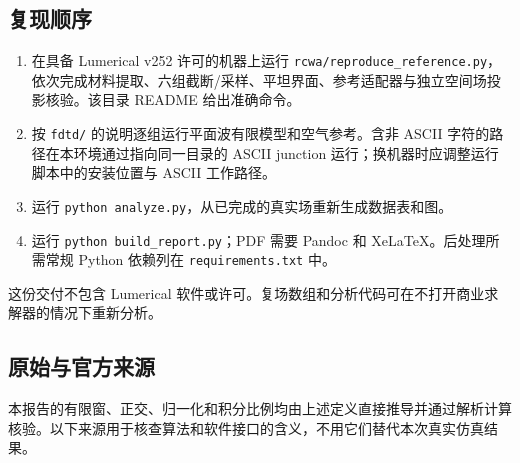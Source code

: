 \documentclass[
  chinese,
  UTF8,
  a4paper,
  11pt]{ctexart}
\providecommand{\tightlist}{%
  \setlength{\itemsep}{0pt}\setlength{\parskip}{0pt}}
\begin{document}
\subsection{复现顺序}\label{ux590dux73b0ux987aux5e8f}

\begin{enumerate}
\def\labelenumi{\arabic{enumi}.}
\tightlist
\item
  在具备 Lumerical v252 许可的机器上运行
  \texttt{rcwa/reproduce\_reference.py}，依次完成材料提取、六组截断/采样、平坦界面、参考适配器与独立空间场投影核验。该目录
  README 给出准确命令。
\item
  按 \texttt{fdtd/} 的说明逐组运行平面波有限模型和空气参考。含非 ASCII
  字符的路径在本环境通过指向同一目录的 ASCII junction
  运行；换机器时应调整运行脚本中的安装位置与 ASCII 工作路径。
\item
  运行 \texttt{python\ analyze.py}，从已完成的真实场重新生成数据表和图。
\item
  运行 \texttt{python\ build\_report.py}；PDF 需要 Pandoc 和
  XeLaTeX。后处理所需常规 Python 依赖列在 \texttt{requirements.txt} 中。
\end{enumerate}

这份交付不包含 Lumerical
软件或许可。复场数组和分析代码可在不打开商业求解器的情况下重新分析。

\subsection{原始与官方来源}\label{ux539fux59cbux4e0eux5b98ux65b9ux6765ux6e90}

本报告的有限窗、正交、归一化和积分比例均由上述定义直接推导并通过解析计算核验。以下来源用于核查算法和软件接口的含义，不用它们替代本次真实仿真结果。
\end{document}
